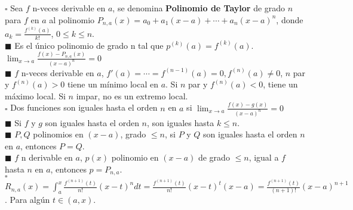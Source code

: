 \documentclass[11pt,a4paper]{article}
\begin{document}
$\square$ Sea $f$ n-veces derivable en $a$, se denomina \textbf{Polinomio de Taylor} de grado $n$ para $f$ en $a$ al polinomio $P_{n,a}(x) = a_0 + a_1 (x-a) + \cdots + a_n(x-a)^n$, donde $a_k = \frac{f^{(k)}(a)}{k!}$, $0 \leq k \leq n$.\\$\blacksquare$ Es el \'unico polinomio de grado n tal que $p^{(k)}(a) = f^{(k)}(a)$. $\lim_{x \to a} \frac{f(x) - P_{n,a}(x)}{(x-a)^n} = 0$\\
$\blacksquare$ $f$ n-veces derivable en $a$, $f'(a) = \cdots = f^{(n-1)}(a) = 0, f^{(n)}(a) \not = 0$, $n$ par y  $f^{(n)}(a) > 0$ tiene un m\'inimo local en $a$. Si $n$ par y $f^{(n)}(a) < 0$, tiene un m\'aximo local. Si $n$ impar, no es un extremo local.\\
$\square$ Dos funciones son iguales hasta el orden $n$ en $a$ si $\lim_{x \to a} \frac{f(x)-g(x)}{(x-a)^n} = 0$\\
$\blacksquare$ Si $f$ y $g$ son iguales hasta el orden $n$, son iguales hasta $k \leq n$.\\
$\blacksquare$ $P,Q$ polinomios en $(x-a)$, grado $\leq n$, si $P$ y $Q$ son iguales hasta el orden $n$ en $a$, entonces $P = Q$.\\
$\blacksquare$ $f$ n derivable en $a$, $p(x)$ polinomio en $(x-a)$ de grado $\leq n$, igual a $f$ hasta $n$ en $a$, entonces $p = P_{n,a}$.\\
$\square$ $R_{n,a}(x) = \int_a^x \frac{f^{(n+1)}(t)}{n!}(x-t)^n dt = \frac{f^{(n+1)}(t)}{n!}(x-t)^t(x-a) = \frac{f^{(n+1)}(t)}{(n+1)!}(x-a)^{n+1}$. Para alg\'un $t \in (a,x)$.

\newpage
\end{document}
